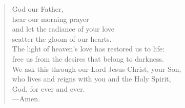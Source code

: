 \prayer

\setlength{\leftmargini}{\prayerleftmargini}

\begin{verse}
God our Father,\\
hear our morning prayer\\
and let the radiance of your love\\
scatter the gloom of our hearts.\\
The light of heaven’s love has restored us to life:\\
free us from the desires that belong to darkness.\\
We ask this through our Lord Jesus Christ, your Son,\\
who lives and reigns with you and the Holy Spirit,\\
God, for ever and ever.\\
{\color{red}---\thinspace}Amen.
\end{verse}

\setlength{\leftmargini}{\defleftmargini}